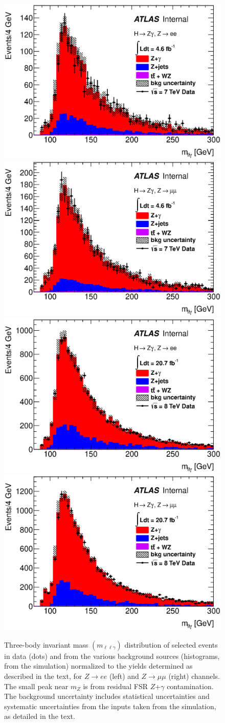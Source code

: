 \begin{figure}[!htbp]
  \begin{center}
    \includegraphics[width=0.49\columnwidth]{figures/bkg_decomposition_2011_e_Mllg_Z_PV_corr_linscale}
    \includegraphics[width=0.49\columnwidth]{figures/bkg_decomposition_2011_mu_Mllg_Z_PV_corr_linscale}
    \includegraphics[width=0.49\columnwidth]{figures/bkg_decomposition_2012_e_Mllg_Z_PV_corr_linscale}
    \includegraphics[width=0.49\columnwidth]{figures/bkg_decomposition_2012_mu_Mllg_Z_PV_corr_linscale}
    \caption{Three-body invariant mass $(m_{\ell\ell\gamma})$ distribution 
      of selected events in data (dots) and from the various
      background sources (histograms, from the simulation) normalized 
      to the yields determined as described in the text, 
      for $Z\to ee$ (left) and $Z\to\mu\mu$ (right) channels.
      The small peak near $m_Z$ is from residual FSR $Z$+$\gamma$ contamination.
      The background uncertainty includes statistical uncertainties and 
      systematic uncertainties from the inputs taken from the simulation, as detailed in the text.
    }
    \label{fig:zgamma_mass_linear}
  \end{center}
\end{figure}

